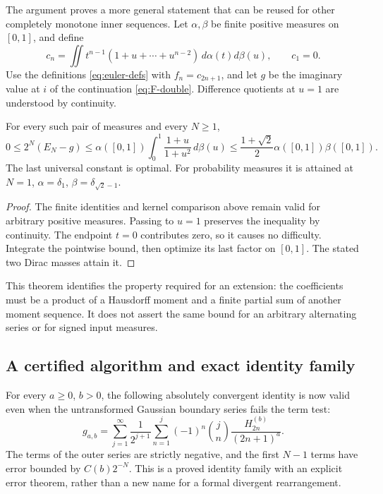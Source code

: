The argument proves a more general statement that can be reused for
other completely monotone inner sequences. Let $\alpha,\beta$ be
finite positive measures on $[0,1]$, and define
\[
 c_n=\iint t^{n-1}(1+u+\cdots+u^{n-2})\,d\alpha(t)d\beta(u),
 \qquad c_1=0.
\]
Use the definitions \eqref{eq:euler-defs} with $f_n=c_{2n+1}$,
and let $g$ be the imaginary value at $i$ of the continuation
\eqref{eq:F-double}. Difference quotients at $u=1$ are understood
by continuity.

\begin{theorem}\label{thm:moment-general}
For every such pair of measures and every $N\geq1$,
\begin{equation}\label{eq:moment-general}
 0\leq2^N(E_N-g)
 \leq\alpha([0,1])\int_0^1\frac{1+u}{1+u^2}\,d\beta(u)
 \leq\frac{1+\sqrt2}{2}\alpha([0,1])\beta([0,1]).
\end{equation}
The last universal constant is optimal. For probability measures it
is attained at $N=1$, $\alpha=\delta_1$,
$\beta=\delta_{\sqrt2-1}$.
\end{theorem}
\begin{proof}
The finite identities and kernel comparison above remain valid for
arbitrary positive measures. Passing to $u=1$ preserves the inequality
by continuity. The endpoint $t=0$ contributes zero, so it causes no
difficulty. Integrate the pointwise bound, then optimize its last
factor on $[0,1]$. The stated two Dirac masses attain it.
\end{proof}

This theorem identifies the property required for an extension:
the coefficients must be a product of a Hausdorff moment and a finite
partial sum of another moment sequence. It does not assert the same
bound for an arbitrary alternating series or for signed input measures.

\subsection{A certified algorithm and exact identity family}

For every $a\geq0$, $b>0$, the following absolutely convergent identity
is now valid even when the untransformed Gaussian boundary series
fails the term test:
\begin{equation}\label{eq:Euler-identity}
 g_{a,b}=\sum_{j=1}^{\infty}\frac1{2^{j+1}}
       \sum_{n=1}^j(-1)^n\binom jn
           \frac{H_{2n}^{(b)}}{(2n+1)^a}.
\end{equation}
The terms of the outer series are strictly negative, and the first
$N-1$ terms have error bounded by $C(b)2^{-N}$. This is a
proved identity family with an explicit error theorem, rather than
a new name for a formal divergent rearrangement.

